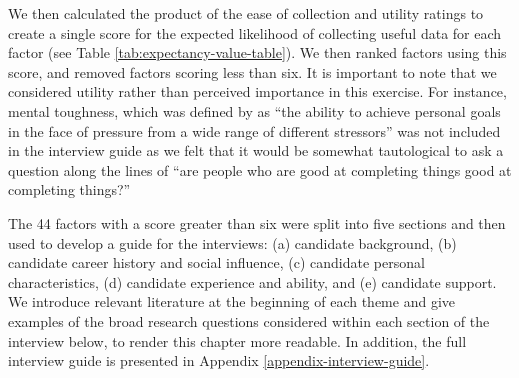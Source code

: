 \documentclass[
  12pt,
  a4paper,
]{book}
\begin{document}
We then calculated the product of the ease of collection and utility ratings to create a single score for the expected likelihood of collecting useful data for each factor (see Table \ref{tab:expectancy-value-table}). We then ranked factors using this score, and removed factors scoring less than six. It is important to note that we considered utility rather than perceived importance in this exercise. For instance, mental toughness, which was defined by \citet{Bell2013} as ``the ability to achieve personal goals in the face of pressure from a wide range of different stressors'' was not included in the interview guide as we felt that it would be somewhat tautological to ask a question along the lines of ``are people who are good at completing things good at completing things?''

The 44 factors with a score greater than six were split into five sections and then used to develop a guide for the interviews: (a) candidate background, (b) candidate career history and social influence, (c) candidate personal characteristics, (d) candidate experience and ability, and (e) candidate support. We introduce relevant literature at the beginning of each theme and give examples of the broad research questions considered within each section of the interview below, to render this chapter more readable. In addition, the full interview guide is presented in Appendix \ref{appendix-interview-guide}.
\end{document}
